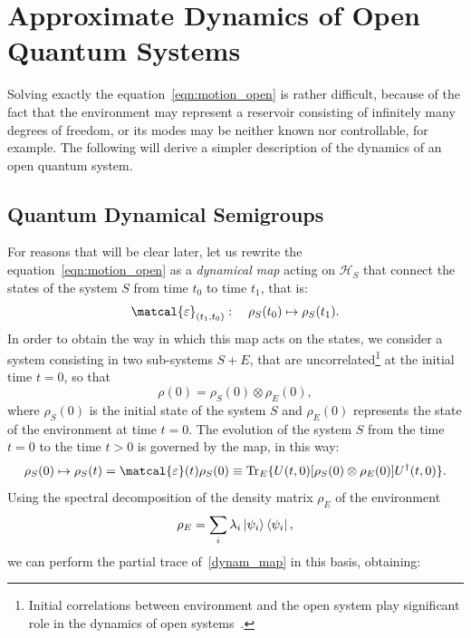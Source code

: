 \section{Approximate Dynamics of Open Quantum Systems}
\label{appr_dynam_oqs}
Solving exactly the equation~\ref{eqn:motion_open} is rather difficult, because of the fact that the environment may represent a reservoir consisting of infinitely many degrees of freedom, or its modes may be neither known nor controllable, for example. The following will derive a simpler description of the dynamics of an open quantum system. 

\subsection{Quantum Dynamical Semigroups}
For reasons that will be clear later, let us rewrite the equation~\ref{eqn:motion_open} as a \emph{dynamical map} acting on $\mathcal{H}_S$ that connect the states of the system $S$ from time $t_0$ to time $t_1$, that is:
\begin{equation}
    \matcal{\varepsilon}_{(t_1, t_0)}: \quad \rho_S(t_0) \mapsto \rho_S(t_1).
\end{equation}
In order to obtain the way in which this map acts on the states, we consider a system consisting in two sub-systems $S+E$, that are uncorrelated\footnote{Initial correlations between environment and the open system play significant role in the dynamics of open systems~\cite{PhysRevA.64.062106}.} at the initial time $t=0$, so that 
\begin{equation}
    \rho(0) = \rho_S(0) \otimes \rho_E(0),
\end{equation}
where $\rho_S(0)$ is the initial state of the system $S$ and $\rho_E(0)$ represents the state of the environment at time $t=0$. The evolution of the system $S$ from the time $t=0$ to the time $t>0$ is governed by the map, in this way:
\begin{equation}
\label{dynam_map}
    \rho_S(0) \mapsto \rho_S(t) = \matcal{\varepsilon}(t)\rho_S(0) \equiv \Tr_E \{U(t, 0)[\rho_S(0) \otimes \rho_E(0)] U^\dagger(t,0)\}.
\end{equation}
Using the spectral decomposition of the density matrix $\rho_E$ of the environment
\begin{equation*}
    \rho_E = \sum_i \lambda_i \ket{\psi_i}\bra{\psi_i},
\end{equation*}
we can perform the partial trace of~\ref{dynam_map} in this basis, obtaining:
